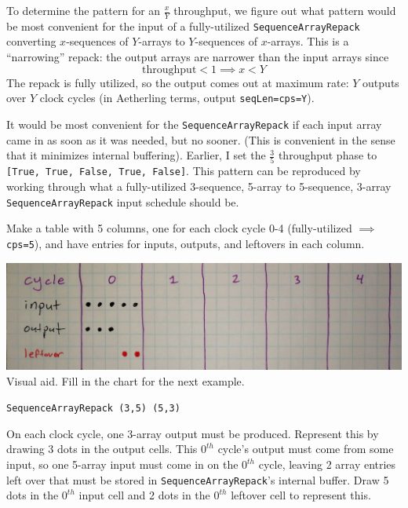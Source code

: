 \documentclass[12pt]{article}
\begin{document}
To determine the pattern for an $\frac{x}{Y}$ throughput, we figure
out what pattern would be most convenient for the input of a
fully-utilized \texttt{SequenceArrayRepack} converting $x$-sequences
of $Y$-arrays to $Y$-sequences of $x$-arrays. This is a ``narrowing''
repack: the output arrays are narrower than the input arrays since
\begin{equation*}
    \text{throughput}<1 \implies x<Y
\end{equation*}
The repack is fully utilized, so the output comes
out at maximum rate: $Y$ outputs over $Y$ clock cycles (in Aetherling
terms, output \texttt{seqLen=cps=Y}).

It would be most convenient for the \texttt{SequenceArrayRepack} if
each input array came in as soon as it was needed, but no sooner.
(This is convenient in the sense that it minimizes internal
buffering). Earlier, I set the $\frac{3}{5}$ throughput phase to
\texttt{[True, True, False, True, False]}. This pattern can be
reproduced by working through what a fully-utilized 3-sequence,
5-array to 5-sequence, 3-array \texttt{SequenceArrayRepack} input
schedule should be.

\newpage
Make a table with 5 columns, one for each clock
cycle 0-4 (fully-utilized $\implies$ \texttt{cps=5}), and have entries
for inputs, outputs, and leftovers in each column.

\begin{center}
\includegraphics[width=1.0\linewidth]{Figures/sorry-if-patronizing.jpg}
Visual aid. Fill in the chart for the next example.

\texttt{SequenceArrayRepack (3,5) (5,3)}
\end{center}

On each clock cycle, one 3-array output must be produced. Represent
this by drawing 3 dots in the output cells. This $0^{th}$ cycle's
output must come from some input, so one 5-array input must come in
on the $0^{th}$ cycle, leaving 2 array entries left over that must
be stored in \texttt{SequenceArrayRepack}'s internal buffer. Draw
5 dots in the $0^{th}$ input cell and 2 dots in the $0^{th}$
leftover cell to represent this.
\end{document}
